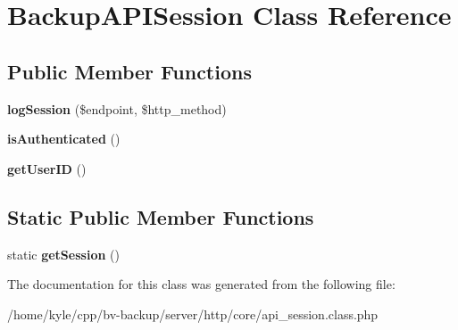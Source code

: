 \hypertarget{class_backup_a_p_i_session}{}\section{Backup\+A\+P\+I\+Session Class Reference}
\label{class_backup_a_p_i_session}
\subsection*{Public Member Functions}
\begin{DoxyCompactItemize}
\item 
\mbox{\label{class_backup_a_p_i_session_a2eb66adcfe20654affe39015b851089a}} 
{\bfseries log\+Session} (\$endpoint, \$http\+\_\+method)
\item 
\mbox{\label{class_backup_a_p_i_session_a986d734e555c33075911747d0f19be57}} 
{\bfseries is\+Authenticated} ()
\item 
\mbox{\label{class_backup_a_p_i_session_a3fbe8aa59be9d0efe0dbd84e7db42d5a}} 
{\bfseries get\+User\+ID} ()
\end{DoxyCompactItemize}
\subsection*{Static Public Member Functions}
\begin{DoxyCompactItemize}
\item 
\mbox{\label{class_backup_a_p_i_session_aacfebc7f42d2e17e6a66dd76b97c94ce}} 
static {\bfseries get\+Session} ()
\end{DoxyCompactItemize}


The documentation for this class was generated from the following file\+:\begin{DoxyCompactItemize}
\item 
/home/kyle/cpp/bv-\/backup/server/http/core/api\+\_\+session.\+class.\+php\end{DoxyCompactItemize}
